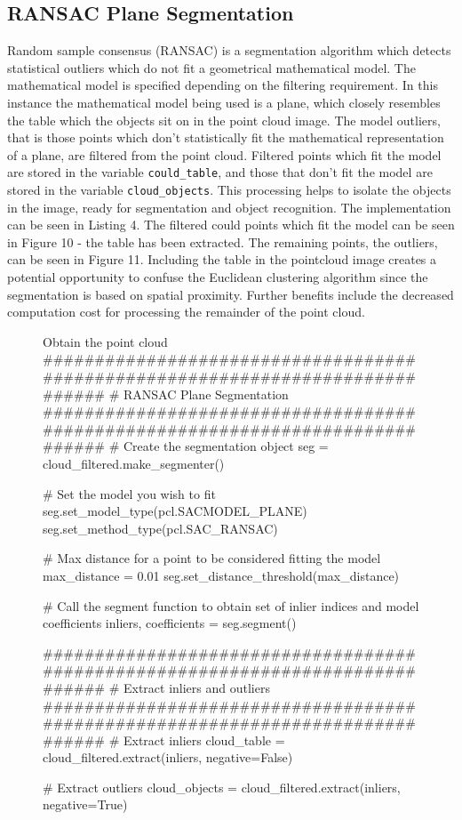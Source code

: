 \documentclass[a4paper]{article}
\begin{document}
\newpage

\subsection{RANSAC Plane Segmentation}
Random sample consensus (RANSAC) is a segmentation algorithm which detects statistical outliers which do not fit a geometrical mathematical model. The mathematical model is specified depending on the filtering requirement. In this instance the mathematical model being used is a plane, which closely resembles the table which the objects sit on in the point cloud image. The model outliers, that is those points which don't statistically fit the mathematical representation of a plane, are filtered from the point cloud. Filtered points which fit the model are stored in the variable \verb|could_table|, and those that don't fit the model are stored in the variable \verb|cloud_objects|. This processing helps to isolate the objects in the image, ready for segmentation and object recognition. The implementation can be seen in Listing 4. The filtered could points which fit the model can be seen in Figure 10 - the table has been extracted. The remaining points, the outliers, can be seen in Figure 11. Including the table in the pointcloud image creates a potential opportunity to confuse the Euclidean clustering algorithm since the segmentation is based on spatial proximity. Further benefits include the decreased computation cost for processing the remainder of the point cloud.

\vspace{0.25cm}

\begin{figure}[h]\scriptsize
\begin{sexylisting}{Obtain the point cloud}
##############################################################################
    # RANSAC Plane Segmentation
##############################################################################
    # Create the segmentation object
    seg = cloud_filtered.make_segmenter()

    # Set the model you wish to fit
    seg.set_model_type(pcl.SACMODEL_PLANE)
    seg.set_method_type(pcl.SAC_RANSAC)

    # Max distance for a point to be considered fitting the model
    max_distance = 0.01
    seg.set_distance_threshold(max_distance)

    # Call the segment function to obtain set of inlier indices and model coefficients
    inliers, coefficients = seg.segment()
    
##############################################################################
    # Extract inliers and outliers
##############################################################################
    # Extract inliers
    cloud_table = cloud_filtered.extract(inliers, negative=False)

    # Extract outliers
    cloud_objects = cloud_filtered.extract(inliers, negative=True)
\end{sexylisting}
\end{figure}
\end{document}
